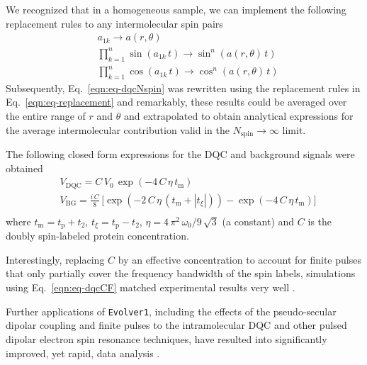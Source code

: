 We recognized that in a homogeneous sample, we can implement the following replacement rules to any intermolecular spin pairs 
\begin{equation}
    \begin{split}
        & a_{1k} \to a(r, \theta) \\
        & \prod_{k=1}^n \sin{(a_{1k}\, t)} \to \sin^n{(a(r, \theta)\,t)} \\
        & \prod_{k=1}^n \cos{(a_{1k}\, t)} \to \cos^n{(a(r, \theta)\,t)}
    \end{split}
    \label{eqn:eq-replacement}
\end{equation}
Subsequently, Eq.~\ref{eqn:eq-dqcNspin} was rewritten using the replacement rules in Eq.~\ref{eqn:eq-replacement} and remarkably, these results could be averaged over the entire range of $r$ and $\theta$ and extrapolated to obtain analytical expressions for the average intermolecular contribution valid in the $N_{\mathrm{spin}} \rightarrow \infty$ limit. 

The following closed form expressions for the DQC and background signals were obtained \cite{SinhaRoy2024apr}
\begin{equation}
    \begin{split}
        &V_\mathrm{DQC} = C\, V_0\,\exp{\left(-4\,C\,\eta\,t_\mathrm{m}\right)} \\
        &V_\mathrm{BG} = \frac{i\,C}{8}\,\bigg[\exp{\left(-2\,C\,\eta\,(t_\mathrm{m} + |t_\xi|)\right)} - \exp{\left(-4\,C\,\eta\,t_\mathrm{m}\right)}\bigg] \\
    \end{split}
    \label{eqn:eq-dqcCF}
\end{equation}
where $t_\mathrm{m} = t_\mathrm{p} + t_2$, $t_\xi = t_\mathrm{p} - t_2$, $\eta = 4\,\pi^2\,\omega_0/9\,\sqrt{3}$ (a constant) and $C$ is the doubly spin-labeled protein concentration.

Interestingly, replacing $C$ by an effective concentration to account for finite pulses that only partially cover the frequency bandwidth of the spin labels, simulations using Eq.~\ref{eqn:eq-dqcCF} matched experimental results very well \cite{SinhaRoy2026jan, Mandato2025jul}.

Further applications of \verb+Evolver1+, including the effects of the pseudo-secular dipolar coupling and finite pulses to the intramolecular DQC and other pulsed dipolar electron spin resonance techniques, have resulted into significantly improved, yet rapid, data analysis \cite{SinhaRoy2024apr,SinhaRoy2025jan,SinhaRoy2026jan}.